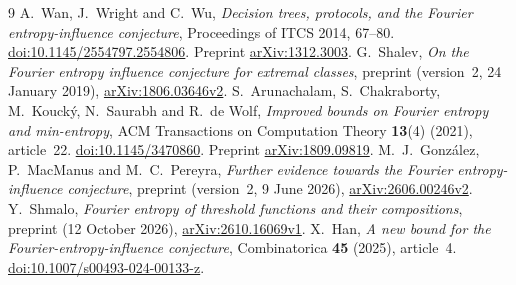 \documentclass[
  american,
  11pt,
]{article}
\begin{document}
\begin{thebibliography}{9}
  A.~Wan, J.~Wright and C.~Wu, \emph{Decision trees, protocols, and the
  Fourier entropy-influence conjecture}, Proceedings of ITCS 2014,
  67--80.
  \href{https://doi.org/10.1145/2554797.2554806}{doi:10.1145/2554797.2554806}.
  Preprint \href{https://arxiv.org/abs/1312.3003}{arXiv:1312.3003}.
  G.~Shalev, \emph{On the Fourier entropy influence conjecture for
  extremal classes}, preprint (version~2, 24 January 2019),
  \href{https://arxiv.org/abs/1806.03646v2}{arXiv:1806.03646v2}.
  S.~Arunachalam, S.~Chakraborty, M.~Koucký, N.~Saurabh and R.~de Wolf,
  \emph{Improved bounds on Fourier entropy and min-entropy}, ACM
  Transactions on Computation Theory \textbf{13}(4) (2021), article~22.
  \href{https://doi.org/10.1145/3470860}{doi:10.1145/3470860}.
  Preprint \href{https://arxiv.org/abs/1809.09819}{arXiv:1809.09819}.
  M.~J.~González, P.~MacManus and M.~C.~Pereyra, \emph{Further evidence
  towards the Fourier entropy-influence conjecture}, preprint (version~2,
  9 June 2026), \href{https://arxiv.org/abs/2606.00246v2}{arXiv:2606.00246v2}.
  Y.~Shmalo, \emph{Fourier entropy of threshold functions and their
  compositions}, preprint (12 October 2026),
  \href{https://arxiv.org/abs/2610.16069v1}{arXiv:2610.16069v1}.
  X.~Han, \emph{A new bound for the Fourier-entropy-influence conjecture},
  Combinatorica \textbf{45} (2025), article~4.
  \href{https://doi.org/10.1007/s00493-024-00133-z}{doi:10.1007/s00493-024-00133-z}.
\end{thebibliography}
\end{document}
